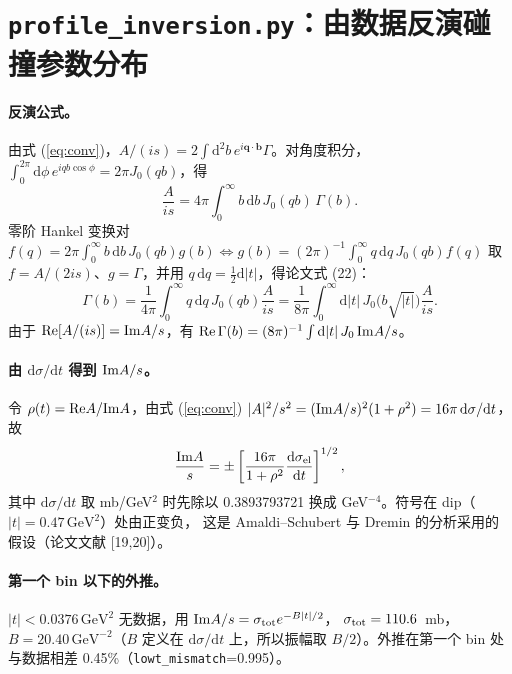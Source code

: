 \documentclass[11pt,a4paper]{ctexart}
\newcommand{\dd}{\mathrm d}
\newcommand{\GeVt}{\,\mathrm{GeV}^2}
\newcommand{\GeVm}{\,\mathrm{GeV}^{-2}}
\begin{document}
\section{\texttt{profile\_inversion.py}：由数据反演碰撞参数分布}

\paragraph{反演公式。}由式 (\ref{eq:conv})，$A/(is)=2\int\dd^2b\,e^{i\bm q\cdot\bm b}\Gamma$。对角度积分，
$\int_0^{2\pi}\dd\phi\,e^{iqb\cos\phi}=2\pi J_0(qb)$，得
\begin{equation}
\frac{A}{is}=4\pi\int_0^\infty b\,\dd b\,J_0(qb)\,\Gamma(b).
\end{equation}
零阶 Hankel 变换对 $f(q)=2\pi\int_0^\infty b\,\dd b\,J_0(qb)g(b)\Leftrightarrow g(b)=(2\pi)^{-1}\int_0^\infty q\,\dd q\,J_0(qb)f(q)$
取 $f=A/(2is)$、$g=\Gamma$，并用 $q\,\dd q=\tfrac12\dd|t|$，得论文式 (22)：
\begin{equation}
\Gamma(b)=\frac{1}{4\pi}\int_0^\infty q\,\dd q\,J_0(qb)\frac{A}{is}
=\frac{1}{8\pi}\int_0^\infty\dd|t|\,J_0\big(b\sqrt{|t|}\big)\frac{A}{is}.
\label{eq:inv}
\end{equation}
由于 ${\rm Re}[A/(is)]={\rm Im}A/s$，有 ${\rm Re}\,\Gamma(b)=(8\pi)^{-1}\int\dd|t|\,J_0\,{\rm Im}A/s$。

\paragraph{由 $\dd\sigma/\dd t$ 得到 ${\rm Im}A/s$。}令 $\rho(t)={\rm Re}A/{\rm Im}A$，由式 (\ref{eq:conv})
$|A|^2/s^2=({\rm Im}A/s)^2(1+\rho^2)=16\pi\,\dd\sigma/\dd t$，故
\begin{equation}
\frac{{\rm Im}A}{s}=\pm\left[\frac{16\pi}{1+\rho^2}\frac{\dd\sigma_{\rm el}}{\dd t}\right]^{1/2},
\end{equation}
其中 $\dd\sigma/\dd t$ 取 mb/GeV$^2$ 时先除以 0.3893793721 换成 GeV$^{-4}$。符号在 dip（$|t|=0.47\GeVt$）处由正变负，
这是 Amaldi--Schubert 与 Dremin 的分析采用的假设（论文文献 [19,20]）。

\paragraph{第一个 bin 以下的外推。}$|t|<0.0376\GeVt$ 无数据，用 ${\rm Im}A/s=\sigma_{\rm tot}e^{-B|t|/2}$，
$\sigma_{\rm tot}=110.6$~mb，$B=20.40\GeVm$（$B$ 定义在 $\dd\sigma/\dd t$ 上，所以振幅取 $B/2$）。外推在第一个 bin 处与数据相差
0.45\%（\texttt{lowt\_mismatch}=0.995）。
\end{document}
